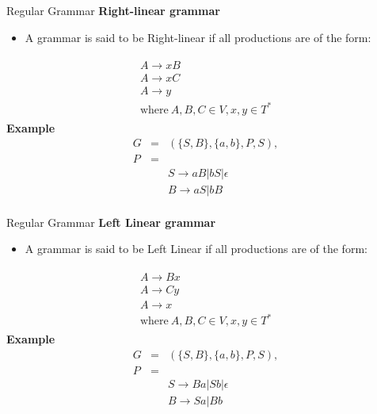 \documentclass{beamer}
\begin{document}
\begin{frame}{Regular Grammar}
	\textbf{Right-linear grammar}
	\begin{itemize}
		\item A grammar is said to be Right-linear if all productions are of the form:
	\end{itemize}
	\begin{equation*}
		\begin{split}\begin{array}{c}
				A \rightarrow xB \\
				A \rightarrow xC \\
				A \rightarrow y \\
				\mbox{where}\ A,B,C \in V, x,y \in T^*
		\end{array}\end{split}
	\end{equation*}
	\textbf{Example}\\
	\begin{eqnarray*}
				G &=& (\{S,B\},\{a,b\},P,S),\\
				P &=& \\
				&&S \rightarrow aB | bS | \epsilon \\
				&&B \rightarrow aS | bB \\
		\end{eqnarray*}

\end{frame}
\begin{frame}{Regular Grammar}
	\textbf{Left Linear grammar}
	\begin{itemize}
		\item A grammar is said to be Left Linear if all productions are of the form:
	\end{itemize}
	\begin{equation*}
		                                       \begin{split}\begin{array}{c}
				A \rightarrow Bx \\
				A \rightarrow Cy \\
				A \rightarrow x \\
				\mbox{where}\ A,B,C \in V, x,y \in T^*
		\end{array}\end{split}
	\end{equation*}
\textbf{Example}\\
\begin{eqnarray*}
	G &=& (\{S,B\},\{a,b\},P,S),\\
	P &=& \\
	&&S \rightarrow Ba | Sb | \epsilon
	 \\
	&&B \rightarrow Sa | Bb \\
\end{eqnarray*}
\end{frame}
\end{document}
